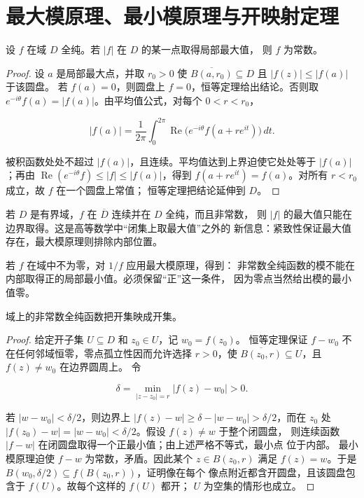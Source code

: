 \section{最大模原理、最小模原理与开映射定理}

\begin{theorem}[强最大模原理]
\label{thm:maximum-modulus-principle}
设 \(f\) 在域 \(D\) 全纯。若 \(|f|\) 在 \(D\) 的某一点取得局部最大值，
则 \(f\) 为常数。
\end{theorem}

\begin{proof}
设 \(a\) 是局部最大点，并取 \(r_0>0\) 使
\(\overline{B(a,r_0)}\subseteq D\) 且 \(|f(z)|\le|f(a)|\) 于该圆盘。
若 \(f(a)=0\)，则圆盘上 \(f=0\)，恒等定理给出结论。否则取
\(e^{-i\theta}f(a)=|f(a)|\)。由平均值公式，对每个 \(0<r<r_0\)，

\[
 |f(a)|=\frac1{2\pi}\int_0^{2\pi}
 \operatorname{Re}\bigl(e^{-i\theta}f(a+re^{it})\bigr)\,dt.
\]

被积函数处处不超过 \(|f(a)|\)，且连续。平均值达到上界迫使它处处等于
\(|f(a)|\)；再由
\(\operatorname{Re}(e^{-i\theta}f)\le|f|\le|f(a)|\)，得到
\(f(a+re^{it})=f(a)\)。对所有 \(r<r_0\) 成立，故 \(f\) 在一个圆盘上常值；
恒等定理把结论延伸到 \(D\)。
\end{proof}

若 \(D\) 是有界域，\(f\) 在 \(\overline D\) 连续并在 \(D\) 全纯，而且非常数，
则 \(|f|\) 的最大值只能在边界取得。这是高等数学中“闭集上取最大值”之外的
新信息：紧致性保证最大值存在，最大模原理则排除内部位置。

若 \(f\) 在域中不为零，对 \(1/f\) 应用最大模原理，得到：
非常数全纯函数的模不能在内部取得正的局部最小值。必须保留“正”这一条件，
因为零点当然给出模的最小值零。

\begin{theorem}[开映射定理]
\label{thm:holomorphic-open-mapping}
域上的非常数全纯函数把开集映成开集。
\end{theorem}

\begin{proof}
给定开子集 \(U\subseteq D\) 和 \(z_0\in U\)，记 \(w_0=f(z_0)\)。
恒等定理保证 \(f-w_0\) 不在任何邻域恒零，零点孤立性因而允许选择 \(r>0\)，使
\(\overline{B(z_0,r)}\subseteq U\)，且 \(f(z)\ne w_0\) 在边界圆周上。
令

\[
 \delta=\min_{|z-z_0|=r}|f(z)-w_0|>0.
\]

若 \(|w-w_0|<\delta/2\)，则边界上
\(|f(z)-w|\ge\delta-|w-w_0|>\delta/2\)，而在 \(z_0\) 处
\(|f(z_0)-w|=|w-w_0|<\delta/2\)。假设 \(f(z)\ne w\) 于整个闭圆盘，
则连续函数 \(|f-w|\) 在闭圆盘取得一个正最小值；由上述严格不等式，最小点
位于内部。
最小模原理迫使 \(f-w\) 为常数，矛盾。因此某个 \(z\in B(z_0,r)\) 满足
\(f(z)=w\)。于是 \(B(w_0,\delta/2)\subseteq f(B(z_0,r))\)，证明像在每个
像点附近都含开圆盘，且该圆盘包含于 \(f(U)\)。故每个这样的 \(f(U)\) 都开；
\(U\) 为空集的情形也成立。
\end{proof}

